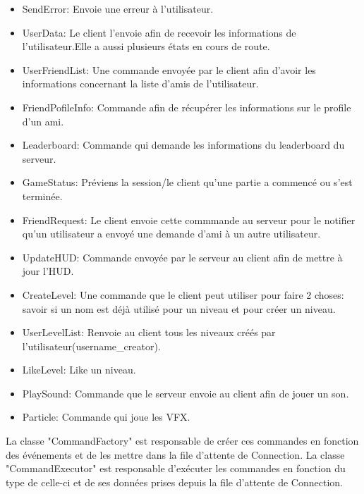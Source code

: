 \documentclass[french]{article}
\begin{document}
\begin{itemize}
    \item SendError: Envoie une erreur à l'utilisateur.
    \item UserData: Le client l'envoie afin de recevoir les informations de l'utilisateur.Elle a aussi plusieurs états en cours de route.
    \item UserFriendList: Une commande envoyée par le client afin d'avoir les informations concernant la liste d'amis de l'utilisateur.
    \item FriendPofileInfo: Commande afin de récupérer les informations sur le profile d'un ami.
    \item Leaderboard: Commande qui demande les informations du leaderboard du serveur.
    \item GameStatus: Préviens la session/le client qu'une partie a commencé ou s'est terminée.
    \item FriendRequest: Le client envoie cette commmande au serveur pour le notifier qu'un utilisateur a envoyé une demande d'ami à un autre utilisateur.
    \item UpdateHUD: Commande envoyée par le serveur au client afin de mettre à jour l'HUD.
    \item CreateLevel: Une commande que le client peut utiliser pour faire 2 choses: savoir si un nom est déjà utilisé pour un niveau et pour créer un niveau.
    \item UserLevelList: Renvoie au client tous les niveaux créés par l'utilisateur(username\_creator).
    \item LikeLevel: Like un niveau.
    \item PlaySound: Commande que le serveur envoie au client afin de jouer un son.
    \item Particle: Commande qui joue les VFX.\newline
\end{itemize}

La classe "CommandFactory" est responsable de créer ces commandes en fonction des événements et de les mettre dans la file d'attente de Connection.\newline
La classe "CommandExecutor" est responsable d'exécuter les commandes en fonction du type de celle-ci et de ses données prises depuis la file d'attente de Connection.
\end{document}
